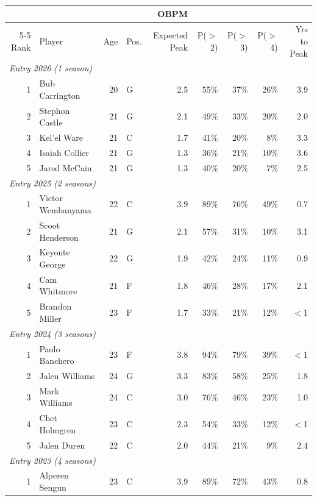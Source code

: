 \begin{table}[htbp]
  \centering\small
  \begin{tabular}{rlrlrrrrr}
    \toprule
     & & & & OBPM & & & & \\
    \cmidrule(lr){5-5}
    Rank & Player & Age & Pos. & Expected Peak & P($>$2) & P($>$3) & P($>$4) & Yrs to Peak \\
    \midrule
    \multicolumn{9}{l}{\textit{Entry 2026 (1 season)}} \\
    \midrule
    1 & Bub Carrington & 20 & G & 2.5 & 55\% & 37\% & 26\% & 3.9 \\
    2 & Stephon Castle & 21 & G & 2.1 & 49\% & 33\% & 20\% & 2.0 \\
    3 & Kel'el Ware & 21 & C & 1.7 & 41\% & 20\% & 8\% & 3.3 \\
    4 & Isaiah Collier & 21 & G & 1.3 & 36\% & 21\% & 10\% & 3.6 \\
    5 & Jared McCain & 21 & G & 1.3 & 40\% & 20\% & 7\% & 2.5 \\
    \midrule[0.4pt]
    \multicolumn{9}{l}{\textit{Entry 2025 (2 seasons)}} \\
    \midrule
    1 & Victor Wembanyama & 22 & C & 3.9 & 89\% & 76\% & 49\% & 0.7 \\
    2 & Scoot Henderson & 21 & G & 2.1 & 57\% & 31\% & 10\% & 3.1 \\
    3 & Keyonte George & 22 & G & 1.9 & 42\% & 24\% & 11\% & 0.9 \\
    4 & Cam Whitmore & 21 & F & 1.8 & 46\% & 28\% & 17\% & 2.1 \\
    5 & Brandon Miller & 23 & F & 1.7 & 33\% & 21\% & 12\% & $<$1 \\
    \midrule[0.4pt]
    \multicolumn{9}{l}{\textit{Entry 2024 (3 seasons)}} \\
    \midrule
    1 & Paolo Banchero & 23 & F & 3.8 & 94\% & 79\% & 39\% & $<$1 \\
    2 & Jalen Williams & 24 & G & 3.3 & 83\% & 58\% & 25\% & 1.8 \\
    3 & Mark Williams & 24 & C & 3.0 & 76\% & 46\% & 23\% & 1.0 \\
    4 & Chet Holmgren & 23 & C & 2.3 & 54\% & 33\% & 12\% & $<$1 \\
    5 & Jalen Duren & 22 & C & 2.0 & 44\% & 21\% & 9\% & 2.4 \\
    \midrule[0.4pt]
    \multicolumn{9}{l}{\textit{Entry 2023 (4 seasons)}} \\
    \midrule
    1 & Alperen Sengun & 23 & C & 3.9 & 89\% & 72\% & 43\% & 0.8 \\

\end{tabular}
\end{table}
